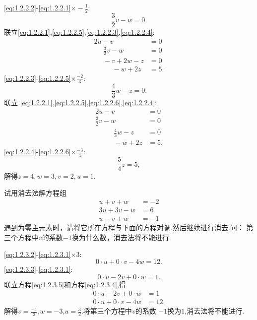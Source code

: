 ﻿\documentclass{book} \usepackage{exsheets} \usepackage{xeCJK}
\begin{document}
\begin{solution}
 \eqref{eq:1.2.2.2}-\eqref{eq:1.2.2.1}$\times -\frac{1}{2}$:
 \begin{equation}
   \label{eq:1.2.2.5}
   \tag{5}
\frac{3}{2}v-w=0.
 \end{equation}
联立\eqref{eq:1.2.2.1},\eqref{eq:1.2.2.5},\eqref{eq:1.2.2.3},\eqref{eq:1.2.2.4}:
\begin{align*}
  2u-v~~~~~~~~~~~~&=0\\
~~~~~~\frac{3}{2}v-w~~~~~~&=0\\
~~~~~~-v+2w-z&=0\\
~~~~~~~~~~~~-w+2z&=5.
\end{align*}
\eqref{eq:1.2.2.3}-\eqref{eq:1.2.2.5}$\times \frac{-2}{3}$:
\begin{equation}\tag{6}
  \label{eq:1.2.2.6}
  \frac{4}{3}w-z=0.
\end{equation}
联立
\eqref{eq:1.2.2.1},\eqref{eq:1.2.2.5},\eqref{eq:1.2.2.6},\eqref{eq:1.2.2.4}:
\begin{align*}
  2u-v~~~~~~~~~~~~&=0\\
\frac{3}{2}v-w~~~~~~&=0\\
~~~~~~~~~~~~\frac{4}{3}w-z&=0\\
~~~~~~~~~~~~-w+2z&=5.
\end{align*}
\eqref{eq:1.2.2.4}-\eqref{eq:1.2.2.6}$\times \frac{-3}{4}$:
$$
\frac{5}{4}z=5,
$$
解得$z=4,w=3,v=2,u=1$.
\end{solution}
\begin{question}
  试用消去法解方程组
  \begin{align}
    u+ v+w&=-2\label{eq:1.2.3.1}\tag{1}\\
   3u+3v-w&=6\label{eq:1.2.3.2}\tag{2}\\
    u- v+w&=-1\label{eq:1.2.3.3}\tag{3}
  \end{align}
遇到为零主元素时，请将它所在方程与下面的方程对调.然后继续进行消去.问：
第三个方程中$v$的系数$-1$换为什么数，消去法将不能进行.
\end{question}
\begin{solution}
 \eqref{eq:1.2.3.2}-\eqref{eq:1.2.3.1}$\times 3$:
 \begin{equation}\tag{4}
   \label{eq:1.2.3.4}
0\cdot u+0\cdot v -4w=12.
 \end{equation}
\eqref{eq:1.2.3.3}-\eqref{eq:1.2.3.1}:
\begin{equation}
  \label{eq:1.2.3.5}
  \tag{5}
0\cdot u-2v+0\cdot w=1.
\end{equation}
联立方程\eqref{eq:1.2.3.5}和方程\eqref{eq:1.2.3.4},得
\begin{align*}
  0\cdot u-2v+0\cdot w&=1\\
 0\cdot u+0\cdot v-4w&=12.
\end{align*}
解得$v=\frac{-1}{2}$,$w=-3$,$u=\frac{3}{2}$.将第三个方程中$v$的系数
$-1$换为$1$,消去法将不能进行.
\end{solution}
\end{document}
